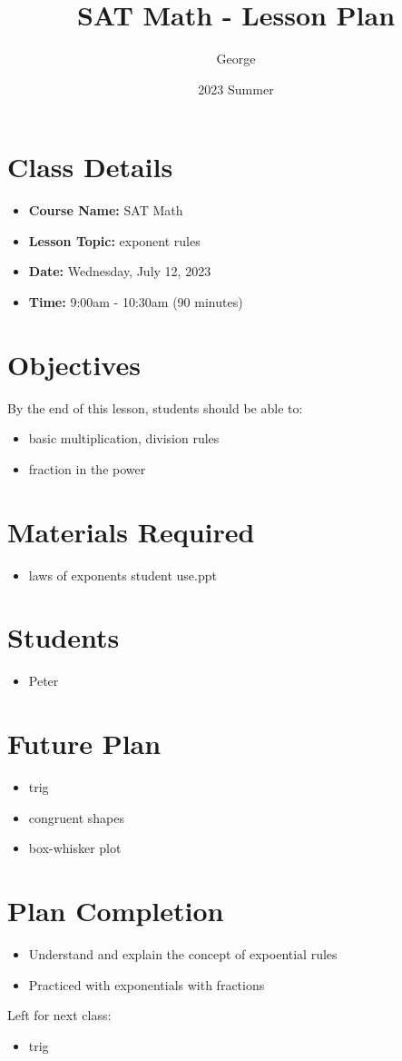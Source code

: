 \documentclass[12pt]{article}
\title{SAT Math - Lesson Plan}
\author{George}
\date{2023 Summer}
\begin{document}
\maketitle

\section{Class Details}
\begin{itemize}
    \item \textbf{Course Name:} SAT Math
    \item \textbf{Lesson Topic:}  exponent rules
    \item \textbf{Date:} Wednesday, July 12, 2023
    \item \textbf{Time:} 9:00am - 10:30am (90 minutes)
\end{itemize}

\section{Objectives}
By the end of this lesson, students should be able to:
\begin{itemize}
    \item basic multiplication, division rules
    \item fraction in the power
\end{itemize}

\section{Materials Required}
\begin{itemize}
   
    \item laws of exponents student use.ppt
   
\end{itemize}


\section{Students}
\begin{itemize}
    \item Peter

\end{itemize}
\section{Future Plan}
\begin{itemize}
    \item trig
    \item congruent shapes
    \item box-whisker plot

\end{itemize}
\section{Plan Completion}
\begin{itemize}
    \item Understand and explain the concept of expoential rules
    \item Practiced with exponentials with fractions
\end{itemize}
Left for next class: 
\begin{itemize}
    \item trig
\end{itemize}
\end{document}
